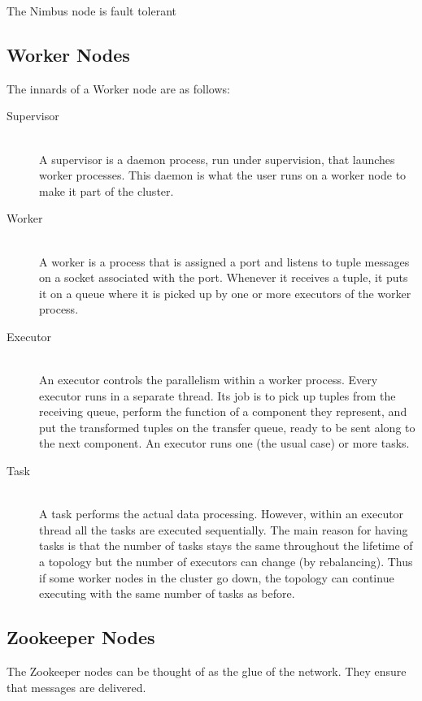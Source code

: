 \documentclass[bsc,logo,frontabs,twoside,singlespacing,normalheadings,parskip]{infthesis}     %
\begin{document}
The Nimbus node is fault tolerant

\subsection{Worker Nodes}

The innards of a Worker node are as follows:

\begin{description}
	\item[Supervisor] \hfill \\
	A supervisor is a daemon process, run under supervision, that launches worker processes. This daemon is what the user runs on a worker node to make it part of the cluster.
	\item[Worker] \hfill \\
	A worker is a process that is assigned a port and listens to tuple messages on a socket associated with the port. Whenever it receives a tuple, it puts it on a queue where it is picked up by one or more executors of the worker process.
	\item[Executor] \hfill \\
	An executor controls the parallelism within a worker process. Every executor runs in a separate thread. Its job is to pick up tuples from the receiving queue, perform the function of a component they represent, and put the transformed tuples on the transfer queue, ready to be sent along to the next component. An executor runs one (the usual case) or more tasks.
	\item[Task] \hfill \\
	A task performs the actual data processing. However, within an executor thread all the tasks are executed sequentially. The main reason for having tasks is that the number of tasks stays the same throughout the lifetime of a topology but the number of executors can change (by rebalancing). Thus if some worker nodes in the cluster go down, the topology can continue executing with the same number of tasks as before.
\end{description}

\subsection{Zookeeper Nodes}

The Zookeeper nodes can be thought of as the glue of the network. They ensure that messages are delivered.
\end{document}
